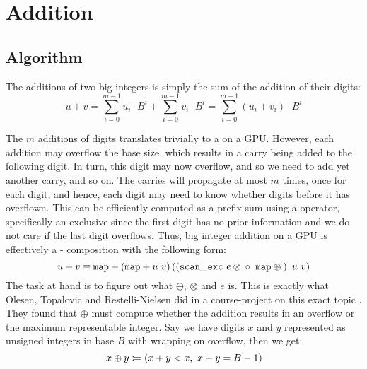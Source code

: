 \section{Addition}
\label{sec:add}

\subsection{Algorithm}

The additions of two big integers is simply the sum of the addition of their digits:
\begin{equation}
  \label{eq:add}
  u + v = \sum_{i=0}^{m-1}u_i\cdot B^{i} + \sum_{i=0}^{m-1}v_i\cdot B^{i} = \sum_{i=0}^{m-1}(u_i+v_i)\cdot B^{i}
\end{equation}

The $m$ additions of digits translates trivially to a  on a GPU. However, each addition may overflow the base size, which results in a carry being added to the following digit. In turn, this digit may now overflow, and so we need to add yet another carry, and so on. The carries will propagate at most $m$ times, once for each digit, and hence, each digit may need to know whether digits before it has overflown. This can be efficiently computed as a prefix sum using a  operator, specifically an exclusive  since the first digit has no prior information and we do not care if the last digit overflows. Thus, big integer addition on a GPU is effectively a - composition with the following form:
\begin{equation}
\label{eq:addgpu}
u + v \equiv \mathtt{map} + \left( \mathtt{map} + u~v\right) \left(\left({\mathtt{scan\_exc}~e \otimes \phantom{}} \circ~\mathtt{map} \oplus \phantom{}\right)~u~v\right)
\end{equation}
The task at hand is to figure out what $\oplus$, $\otimes$ and $e$ is. This is exactly what Olesen, Topalovic and Restelli-Nielsen did in a course-project on this exact topic \cite{DPP-PROJECT}. They found that $\oplus$ must compute whether the addition results in an overflow or the maximum representable integer. Say we have digits $x$ and $y$ represented as unsigned integers in base $B$ with wrapping on overflow, then we get:
\begin{equation}
\label{eq:oplus}
x \oplus y \coloneq (x + y < x,~x + y = B-1)
\end{equation}

